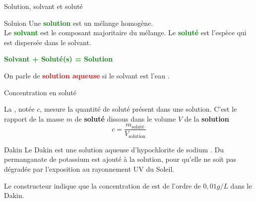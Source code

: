 \begin{doc}{Solution, solvant et soluté}
  \label{doc:solution}
  \vspace*{-24pt}
  \begin{definition}{Soluion}
    Une \textcolor{green}{\textbf{solution}} est un mélange homogène. \\
    Le \textcolor{green}{\textbf{solvant}} est le composant majoritaire du mélange. Le \textcolor{green}{\textbf{soluté}} est l'espèce qui est dispersée dans le solvant.
  \end{definition}
  
  \begin{center}
    \textcolor{green}{\textbf{Solvant + Soluté(s) = Solution}}
  \end{center}
  
  \begin{Large}
  \end{Large}On parle de \textcolor{red}{\textbf{solution aqueuse}} si le solvant est l'eau .
\end{doc}


\begin{doc}{Concentration en soluté}
  \label{doc:concentration}
  \vspace*{-24pt}
  \begin{tcolorbox}[colback=green!5!white,colframe=green!75!black,title=\textbf{Concentration massique}]
    La , notée $c$, mesure la quantité de soluté présent dans une solution.
    C'est le rapport de la masse $m$ de \textbf{soluté} dissous dans le volume $V$ de la \textbf{solution}
    \begin{equation*}
      c = \frac{m_\text{soluté}}{V_\text{solution}}
    \end{equation*}
  \end{tcolorbox}
  
\end{doc}


\newpage
\begin{doc}{Dakin}
  \label{doc:dakin}
  Le Dakin est une solution aqueuse d'hypochlorite de sodium .
  Du permanganate de potassium  est ajouté à la solution, pour qu'elle ne soit pas dégradée par l'exposition au rayonnement UV du Soleil.
  
  \fleche Le constructeur indique que la concentration de  est de l'ordre de $0,\!01 \unit{g/L}$ dans le Dakin.
\end{doc}


